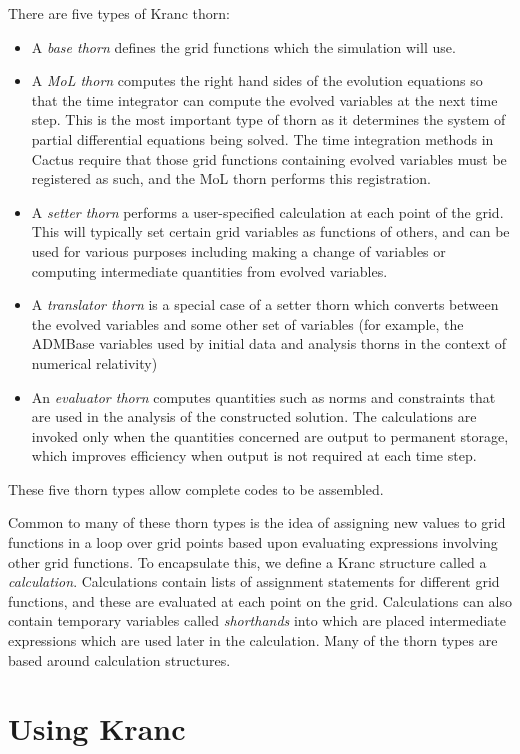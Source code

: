 \documentclass{report}
\begin{document}
There are five types of Kranc thorn:
\begin{itemize}
\item A {\em base thorn} defines the grid functions which the
simulation will use.  
\item A {\em MoL thorn} computes the right hand sides of the evolution
equations so that the time integrator can compute the evolved
variables at the next time step.  This is the most important type of
thorn as it determines the system of partial differential equations
being solved.  The time integration methods in Cactus require that
those grid functions containing evolved variables must be registered
as such, and the MoL thorn performs this registration.
\item A {\em setter thorn} performs a user-specified calculation at
each point of the grid.  This will typically set certain grid
variables as functions of others, and can be used for various purposes
including making a change of variables or computing intermediate
quantities from evolved variables.
\item A {\em translator thorn} is a special case of a setter thorn
which converts between the evolved variables and some other set of
variables (for example, the ADMBase variables used by initial data and
analysis thorns in the context of numerical relativity)
\item An {\em evaluator thorn} computes quantities such as norms and
constraints that are used in the analysis of the constructed solution.
The calculations are invoked only when the quantities concerned are
output to permanent storage, which improves efficiency when output is
not required at each time step.
\end{itemize}
These five thorn types allow complete codes to be assembled.

Common to many of these thorn types is the idea of assigning new
values to grid functions in a loop over grid points based upon
evaluating expressions involving other grid functions. To encapsulate
this, we define a Kranc structure called a {\em
calculation}. Calculations contain lists of assignment statements for
different grid functions, and these are evaluated at each point on the
grid.  Calculations can also contain temporary variables called {\em
shorthands} into which are placed intermediate expressions which are
used later in the calculation.  Many of the thorn types are based
around calculation structures.


\chapter{Using Kranc}
\end{document}
